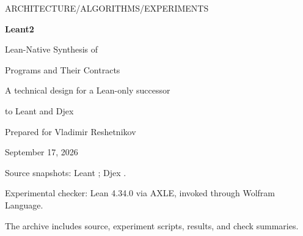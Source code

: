 \documentclass[11pt,letterpaper]{article}
\newcommand{\code}[1]{\texttt{\detokenize{#1}}}
\theoremstyle{remark}\newtheorem{remark}[proposition]{Remark}
\begin{document}
\hypersetup{pageanchor=false}
\begin{titlepage}
\vspace*{0.45in}
{\sffamily\small\color{accent} ARCHITECTURE\quad /\quad ALGORITHMS\quad /\quad EXPERIMENTS}\par
\vspace{0.45in}
{\Huge\sffamily\bfseries Leant2}\par
\vspace{0.15in}
{\LARGE\sffamily Lean-Native Synthesis of\par Programs and Their Contracts}\par
\vspace{0.32in}
{\large A technical design for a Lean-only successor\par to Leant and Djex}\par
\vspace{0.3in}
{\normalsize Prepared for Vladimir Reshetnikov\par September 17, 2026}\par
\vspace{0.45in}
\begin{abstract}
We propose a program synthesizer whose semantic language is Lean itself: exact
universe-polymorphic expressions, dependent telescopes, inductive families,
class evidence, and behavioral propositions. Its central operation is not
``inhabit a simplified type, then test the rendering,'' but a transactional
search for a program and a proof of its exact contract. The search combines
bidirectional term construction, dependency-aware proof obligations,
recursor-derived recursion schemas, library specifications, counterexample
guidance, and optional certified theory solvers. A separate acceptance path
checks closed declarations in the kernel and records their assumptions.

The design specifies the boundaries that make such a system implementable:
which state must be backtracked, how polymorphic applications are instantiated,
how dependent elimination creates motives and transports, when an abstraction
may prune a sketch, and why finite-example equivalence must not permanently
delete alternatives. It also gives an implementation sequence and a benchmark
protocol for measuring practical coverage without changing the original goals.

Two accompanying experiments ground the proposal. A small Lean-native search
engine passed fifteen complete synthesis cases and two supplied elimination
skeletons with synthesized branches on Lean 4.34.0. A finite list-fold experiment
compares ordinary and length-guided counterexample search; separate Lean proofs
verify the length abstraction and the exact selected reverse program. These
experiments validate mechanisms, not a completed Leant2 implementation or a
measured success rate on arbitrary Lean projects.
\end{abstract}
\vfill
{\small\color{muted} Source snapshots: Leant \code{6bf05ad7}; Djex \code{e8778f4e}.\par
Experimental checker: Lean 4.34.0 via AXLE, invoked through Wolfram Language.\par
The archive includes source, experiment scripts, results, and check summaries.}
\end{titlepage}
\end{document}
